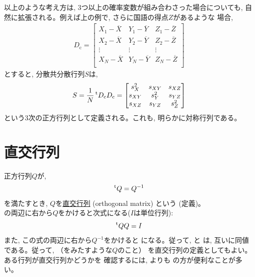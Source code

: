 以上のような考え方は, 3つ以上の確率変数が組み合わさった場合についても, 
自然に拡張される。例えば上の例で, さらに国語の得点$Z$があるような
場合, 
\begin{eqnarray}
D_{\text{c}}=\begin{bmatrix}
X_1 - \overline{X} & Y_1 - \overline{Y} & Z_1 - \overline{Z}\\
X_2 - \overline{X} & Y_2 - \overline{Y} & Z_2 - \overline{Z}\\
\vdots & \vdots & \vdots\\
X_N - \overline{X} & Y_N - \overline{Y} & Z_N - \overline{Z}\\
\end{bmatrix}
\end{eqnarray}
とすると, 分散共分散行列$S$は, 
\begin{eqnarray}
S=\frac{1}{N}\,^{\text t}D_{\text{c}}D_{\text{c}}=\begin{bmatrix}
s_{X}^2 & s_{XY}  & s_{XZ}\\
s_{XY}  & s_{Y}^2 & s_{YZ}\\
s_{XZ}  & s_{YZ}  & s_{Z}^2\\
\end{bmatrix}
\label{eq:covar_matrix_sample3D}
\end{eqnarray}
という3次の正方行列として定義される。これも, 明らかに対称行列である。\\



\section{直交行列}
正方行列$Q$が, 
\begin{eqnarray}^{\text t}Q=Q^{-1}\label{eq:def_orthogmatrix01}\end{eqnarray}
を満たすとき, $Q$を\underline{直交行列} (orthogonal matrix)
という (定義)。\\

の両辺に右から$Q$をかけると次式になる($I$は単位行列):
\begin{eqnarray}^{\text t}QQ=I\label{eq:def_orthogmatrix02}\end{eqnarray}
また, この式の両辺に右から$Q^{-1}$をかけると
になる。従って, と
は, 互いに同値である。従って, 
（をみたすような$Q$のこと）
を直交行列の定義としてもよい。ある行列が直交行列かどうかを
確認するには, よりも
の方が便利なことが多い。
\mv

